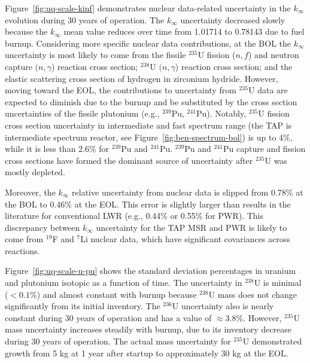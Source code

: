 Figure~\ref{fig:uq-scale-kinf} demonstrates nuclear data-related uncertainty 
in the $k_{\infty}$ evolution during 30 years of operation. The $k_{\infty}$  
uncertainty decreased slowly because the $k_{\infty}$ mean value reduces over 
time from 1.01714 to 0.78143 due to fuel burnup. Considering more specific 
nuclear data contributions, at the \gls{BOL} the $k_{\infty}$ uncertainty is 
most likely to come from the fissile $^{235}$U fission ($n,f$) and neutron 
capture $(n,\gamma$) reaction cross section; $^{238}$U $(n,\gamma$) reaction 
cross section; and the elastic scattering cross section of hydrogen in 
zirconium hydride. However, moving toward the \gls{EOL}, the contributions to 
uncertainty from $^{235}$U data are expected to diminish due to the burnup and 
be substituted by the cross section uncertainties of the fissile plutonium 
(e.g., $^{239}$Pu, $^{241}$Pu). Notably, $^{235}$U fission cross section 
uncertainty in intermediate and fast spectrum range (the \gls{TAP} is 
intermediate spectrum reactor, see Figure~\ref{fig:ben-spectrum-bol}) is up to 
4\%, while it is less than 2.6\% for $^{239}$Pu and $^{241}$Pu. $^{239}$Pu and 
$^{241}$Pu capture and fission cross sections  have formed the 
dominant source of uncertainty after $^{235}$U was mostly depleted. 

Moreover, the $k_{\infty}$ relative uncertainty from
nuclear data is slipped 
from 0.78\% at the \gls{BOL} to 0.46\% at the \gls{EOL}. This error is 
slightly larger than results in the literature for conventional \gls{LWR} 
(e.g., 0.44\% \cite{williams_statistical_2013} or 0.55\% 
\cite{campolina_uncertainty_2018} for \gls{PWR}). This discrepancy between 
$k_{\infty}$ uncertainty for the \gls{TAP} \gls{MSR} and \gls{PWR} is likely 
to come from $^{19}$F and $^{7}$Li nuclear data, which have significant 
covariances across reactions.

Figure~\ref{fig:uq-scale-u-pu} shows the standard deviation percentages in 
uranium and plutonium isotopic as a function of time. The uncertainty in 
$^{238}$U is minimal ($<0.1$\%) and almost constant with burnup because 
$^{238}$U mass does not change significantly from its initial inventory. The 
$^{236}$U uncertainty also is nearly constant during 30 years of operation and 
has a value of $\approx3.8$\%. However, $^{235}$U mass uncertainty increases 
steadily with burnup, due to its inventory decrease during 30 years of 
operation. 
The actual mass uncertainty for $^{235}$U demonstrated growth from 5 kg at 1 
year after startup to approximately 30 kg at the \gls{EOL}.

